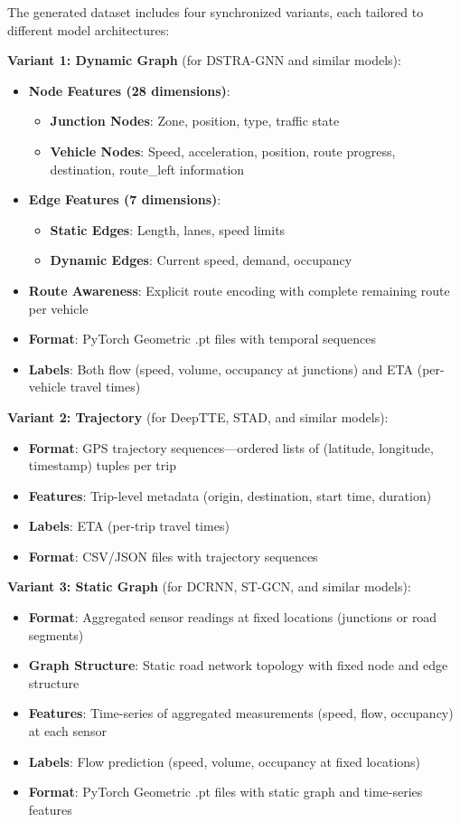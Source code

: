 The generated dataset includes four synchronized variants, each tailored to different model architectures:

\textbf{Variant 1: Dynamic Graph} (for DSTRA-GNN and similar models):
\begin{itemize}
    \item \textbf{Node Features (28 dimensions)}:
    \begin{itemize}
        \item \textbf{Junction Nodes}: Zone, position, type, traffic state
        \item \textbf{Vehicle Nodes}: Speed, acceleration, position, route progress, destination, route\_left information
    \end{itemize}
    \item \textbf{Edge Features (7 dimensions)}:
    \begin{itemize}
        \item \textbf{Static Edges}: Length, lanes, speed limits
        \item \textbf{Dynamic Edges}: Current speed, demand, occupancy
    \end{itemize}
    \item \textbf{Route Awareness}: Explicit route encoding with complete remaining route per vehicle
    \item \textbf{Format}: PyTorch Geometric .pt files with temporal sequences
    \item \textbf{Labels}: Both flow (speed, volume, occupancy at junctions) and ETA (per-vehicle travel times)
\end{itemize}

\textbf{Variant 2: Trajectory} (for DeepTTE, STAD, and similar models):
\begin{itemize}
    \item \textbf{Format}: GPS trajectory sequences—ordered lists of (latitude, longitude, timestamp) tuples per trip
    \item \textbf{Features}: Trip-level metadata (origin, destination, start time, duration)
    \item \textbf{Labels}: ETA (per-trip travel times)
    \item \textbf{Format}: CSV/JSON files with trajectory sequences
\end{itemize}

\textbf{Variant 3: Static Graph} (for DCRNN, ST-GCN, and similar models):
\begin{itemize}
    \item \textbf{Format}: Aggregated sensor readings at fixed locations (junctions or road segments)
    \item \textbf{Graph Structure}: Static road network topology with fixed node and edge structure
    \item \textbf{Features}: Time-series of aggregated measurements (speed, flow, occupancy) at each sensor
    \item \textbf{Labels}: Flow prediction (speed, volume, occupancy at fixed locations)
    \item \textbf{Format}: PyTorch Geometric .pt files with static graph and time-series features
\end{itemize}

